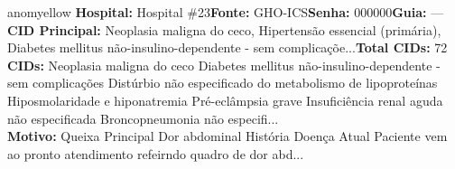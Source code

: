 \documentclass[a4paper,10pt]{article}
\begin{document}
\begin{anomalycard}[Interna\c{c}\~{a}o \#304 | Pac. \#368 | MODERADO (z=2.09) | LOS: 3d | 23/02/2026\,$\to$\,26/02/2026]{anomyellow}
\textbf{Hospital:} Hospital \#23\quad \textbf{Fonte:} GHO-ICS\quad \textbf{Senha:} 000000\quad \textbf{Guia:} ---\\

\textbf{CID Principal:} {\small Neoplasia maligna do ceco, Hipertensão essencial (primária), Diabetes mellitus não-insulino-dependente - sem complicaçõe...}\quad\textbf{Total CIDs:} 72\\

\textbf{CIDs:} {\scriptsize Neoplasia maligna do ceco \textbar{} Diabetes mellitus não-insulino-dependente - sem complicações \textbar{} Distúrbio não especificado do metabolismo de lipoproteínas \textbar{} Hiposmolaridade e hiponatremia \textbar{} Pré-eclâmpsia grave \textbar{} Insuficiência renal aguda não especificada \textbar{} Broncopneumonia não especifi...}\\

\textbf{Motivo:} {\scriptsize Queixa Principal    Dor abdominal    História Doença Atual    Paciente vem ao pronto atendimento refeirndo quadro de dor abd...}\\

\end{anomalycard}
\end{document}
